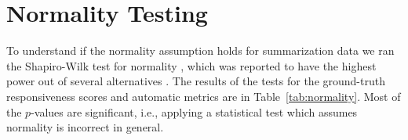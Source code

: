 

\section{Normality Testing}
\label{appendix:normality}

To understand if the normality assumption holds for summarization data we ran the Shapiro-Wilk test for normality \citep{ShapiroWi65}, which was reported to have the highest power out of several alternatives \citep{RazaliWa11,DBSR18,DPSR20}.
The results of the tests for the ground-truth responsiveness scores and automatic metrics are in Table~\ref{tab:normality}.
Most of the $p$-values are significant, i.e., applying a statistical test which assumes normality is incorrect in general.

